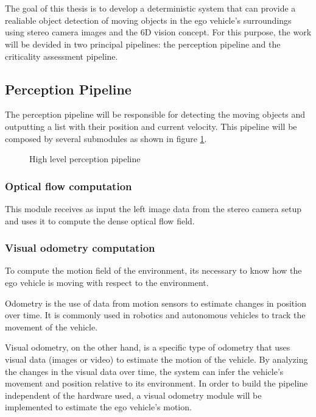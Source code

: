 \section{}%


The goal of this thesis is to develop a deterministic system that can provide a realiable object detection
of moving objects in the ego vehicle's surroundings using stereo camera images and the 6D vision concept.
For this purpose, the work will be devided in two principal pipelines: the perception pipeline 
and the criticality assessment pipeline.

\subsection{Perception Pipeline}%

The perception pipeline will be responsible for detecting the moving objects and outputting 
a list with their position and current velocity. This pipeline will be composed by several submodules as shown in figure \ref{fig:perception_pipeline_high_level}.

\begin{figure}[htb]
  \centering
  \resizebox{0.8\textwidth}{!}{}
  \caption{High level perception pipeline}
  \label{fig:perception_pipeline_high_level}
\end{figure}%

\subsubsection{Optical flow computation}

This module receives as input the left image data from the stereo camera setup and uses it to compute the dense optical flow field.

\subsubsection{Visual odometry computation}

To compute the motion field of the environment, its necessary to know how the ego vehicle is moving with respect 
to the environment.  

Odometry is the use of data from motion sensors to estimate changes in position over time. It is commonly used in 
robotics and autonomous vehicles to track the movement of the vehicle.

Visual odometry, on the other hand, is a specific type of odometry that uses visual data (images or video) to 
estimate the motion of the vehicle. By analyzing the changes in the visual data over time, the system can infer 
the vehicle's movement and position relative to its environment. 
In order to build the pipeline independent of the hardware used, a visual odometry module will 
be implemented to estimate the ego vehicle's motion. 

